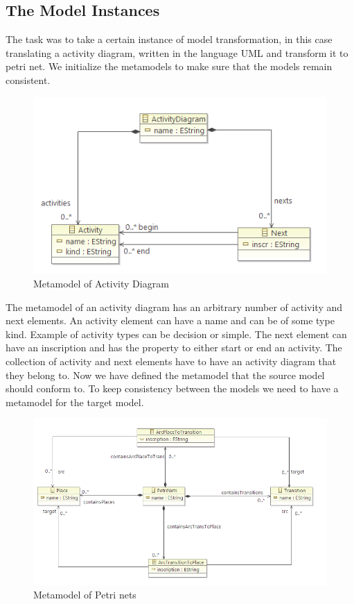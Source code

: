 \documentclass[pdftex,11pt,a4paper]{article}
\begin{document}
\subsection{The Model Instances}
The task was to take a certain instance of model transformation, in this case
translating a activity diagram, written in the language UML and
transform it to petri net. We initialize the metamodels to make sure that the
models remain consistent.

\begin{figure}[H]
	\centering
	\includegraphics[scale=0.5]{figures/ActivityMetamodel.png}
	\caption{Metamodel of Activity Diagram }
	\label{fig:ActivityMetamodel}
\end{figure}

The metamodel of an activity diagram has an arbitrary number of activity and
next elements. An activity element can have a name and can be of some type kind.
Example of activity types can be decision or simple. The next element can have
an inscription and has the property to either start or end an activity. The
collection of activity and next elements have to have an activity diagram that
they belong to. Now we have defined the metamodel that the source model should
conform to. To keep consistency between the models we need to have a
metamodel for the target model.

\begin{figure}[H]
	\centering
	\includegraphics[scale=0.5]{figures/PetriNetsMetamodel.png}
	\caption{Metamodel of Petri nets}
	\label{fig:PetriNetsMetamodel}
\end{figure}
\end{document}
